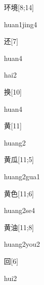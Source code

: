 \begin{verbete}{环境}[8;14]
\begin{pronuncia}{huan1jing4}
\end{pronuncia}
\end{verbete}

\begin{verbete}[huan4]{还}[7]
\begin{pronuncia}{huan4}
\end{pronuncia}
\begin{pronuncia}{hai2}
\end{pronuncia}
\end{verbete}

\begin{verbete}[huan4]{换}[10]
\begin{pronuncia}{huan4}
\end{pronuncia}
\end{verbete}

\begin{verbete}[huang2]{黄}[11]
\begin{pronuncia}{huang2}
\end{pronuncia}
\end{verbete}

\begin{verbete}{黄瓜}[11;5]
\begin{pronuncia}{huang2gua1}
\end{pronuncia}
\end{verbete}

\begin{verbete}[huang2se4]{黄色}[11;6]
\begin{pronuncia}{huang2se4}
\end{pronuncia}
\end{verbete}

\begin{verbete}{黄油}[11;8]
\begin{pronuncia}{huang2you2}
\end{pronuncia}
\end{verbete}

\begin{verbete}[hui2]{回}[6]
\begin{pronuncia}{hui2}
\end{pronuncia}
\end{verbete}

